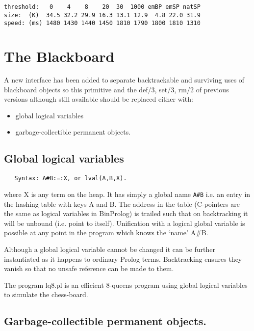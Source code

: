 \documentclass{article}
\begin{document}
{\small
\begin{verbatim}
threshold:   0    4    8    20  30  1000 emBP emSP natSP
size:  (K)  34.5 32.2 29.9 16.3 13.1 12.9  4.8 22.0 31.9
speed: (ms) 1480 1430 1440 1450 1810 1790 1800 1810 1310
\end{verbatim}
}


\section{The Blackboard}

A new interface has been added to separate backtrackable
and surviving uses of blackboard objects so this primitive
and the def/3, set/3, rm/2 of previous versions although still
available should be replaced either with:

\begin{itemize}
\item global logical variables
\item garbage-collectible permanent objects.
\end{itemize}

\subsection{Global logical variables}

\begin{verbatim}
   Syntax: A#B:=:X, or lval(A,B,X).
\end{verbatim}

{\flushleft where X} is any term on the heap. 
It has simply a global name {\tt A\#B} i.e. an
entry in the hashing table with keys A and B.  The address in the table
(C-pointers are the same as logical variables in BinProlog) is trailed
such that on backtracking it will be unbound (i.e. point to itself).
Unification with a logical global variable is possible at any point in the program which knows the `name' A\#B.

Although a global logical variable cannot be changed it can be
further instantiated as it happens to ordinary Prolog terms.
Backtracking ensures they vanish so that no unsafe reference can be
made to them.

The program lq8.pl is an efficient 8-queens program using
global logical variables to simulate the chess-board.

\subsection{Garbage-collectible permanent objects.}
\end{document}
